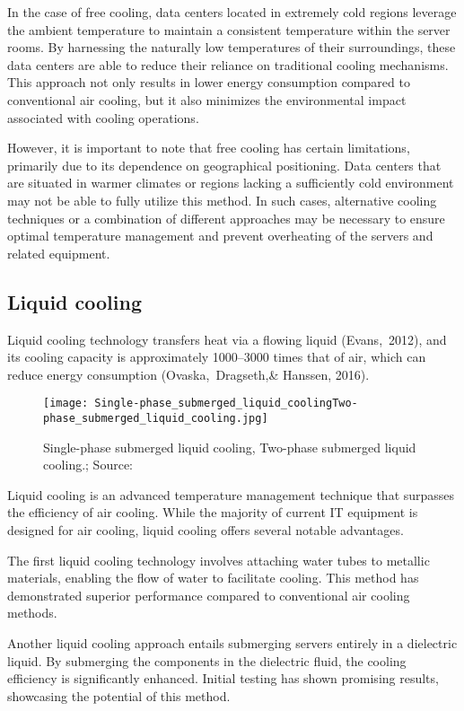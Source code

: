 \documentclass[
  a4paper,  %
  twoside,  %
  bibliography=totoc,
  headsepline,
  cleardoublepage=empty,
  parskip=half,
  draft=false
]{scrbook}
\begin{document}
In the case of free cooling, data centers located in extremely cold regions leverage the ambient temperature to maintain a consistent temperature within the server rooms. By harnessing the naturally low temperatures of their surroundings, these data centers are able to reduce their reliance on traditional cooling mechanisms. This approach not only results in lower energy consumption compared to conventional air cooling, but it also minimizes the environmental impact associated with cooling operations.

However, it is important to note that free cooling has certain limitations, primarily due to its dependence on geographical positioning. Data centers that are situated in warmer climates or regions lacking a sufficiently cold environment may not be able to fully utilize this method. In such cases, alternative cooling techniques or a combination of different approaches may be necessary to ensure optimal temperature management and prevent overheating of the servers and related equipment.

\subsection{Liquid cooling}

Liquid cooling technology transfers heat via a flowing liquid (Evans, 2012), and its cooling capacity is approximately 1000–3000 times that of air, which can reduce energy consumption (Ovaska, Dragseth,\& Hanssen, 2016).


\begin{figure}
	\centering
	\texttt{[image: Single-phase\_submerged\_liquid\_coolingTwo-phase\_submerged\_liquid\_cooling.jpg]}
	\caption{Single-phase submerged liquid cooling, Two-phase submerged liquid cooling.; Source: \cite{li2023china}}
\end{figure}

Liquid cooling is an advanced temperature management technique that surpasses the efficiency of air cooling. While the majority of current IT equipment is designed for air cooling, liquid cooling offers several notable advantages.

The first liquid cooling technology involves attaching water tubes to metallic materials, enabling the flow of water to facilitate cooling. This method has demonstrated superior performance compared to conventional air cooling methods.

Another liquid cooling approach entails submerging servers entirely in a dielectric liquid. By submerging the components in the dielectric fluid, the cooling efficiency is significantly enhanced. Initial testing has shown promising results, showcasing the potential of this method.
\end{document}
